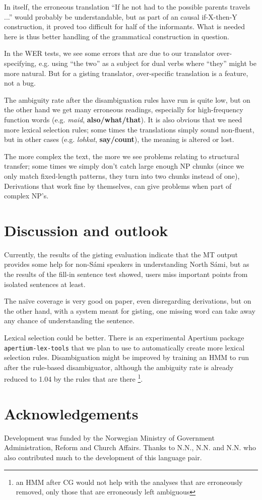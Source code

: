 
In itself, the erroneous translation ``If he not had to the possible
parents travels ...'' would probably be understandable, but as part of
an causal if-X-then-Y construction, it proved too difficult for half
of the informants. What is needed here is thus better handling of the
grammatical construction in question.

In the WER tests, we see some errors that are due to our translator
over-specifying, e.g. using ``the two'' as a subject for dual verbs
where ``they'' might be more natural. But for a gisting translator,
over-specific translation is a feature, not a bug.

The ambiguity rate after the disambiguation rules have run is quite
low, but on the other hand we get many erroneous readings, especially
for high-frequency function words (e.g. \textit{maid},
\textbf{also/what/that}). It is also obvious that we need more lexical
selection rules; some times the translations simply sound non-fluent,
but in other cases (e.g. \textit{lohkat}, \textbf{say/count}), the
meaning is altered or lost.

The more complex the text, the more we see problems relating to
structural transfer; some times we simply don't catch large enough NP
chunks (since we only match fixed-length patterns, they turn into two
chunks instead of one), Derivations that work fine by themselves, can
give problems when part of complex NP's.





\section{Discussion and outlook}
Currently, the results of the gisting evaluation indicate that the MT
output provides some help for non-Sámi speakers in understanding
North Sámi, but as the results of the fill-in sentence test showed,
users miss important points from isolated sentences at least.

The naïve coverage is very good on paper, even disregarding
derivations, but on the other hand, with a system meant for gisting,
one missing word can take away any chance of understanding the
sentence.

Lexical selection could be better. There is an experimental Apertium
package \texttt{apertium-lex-tools} that we plan to use to
automatically create more lexical selection rules. Disambiguation
might be improved by training an HMM to run after the rule-based
disambiguator, although the ambiguity rate is already reduced to 1.04
by the rules that are there \footnote{an HMM after CG would not help
  with the analyses that are erroneously removed, only those that are
  erroneously left ambiguous}. 

\section*{Acknowledgements}
Development was funded by the Norwegian Ministry of Government
Administration, Reform and Church Affairs. Thanks to N.N., N.N. and
N.N. who also contributed much to the development of this language
pair.


